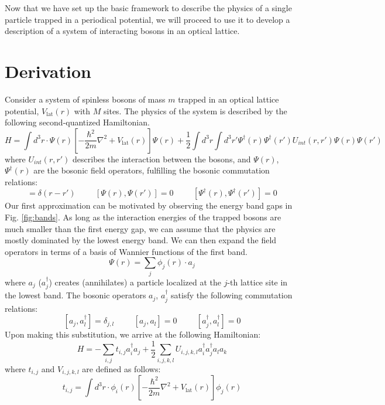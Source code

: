 Now that we have set up the basic framework to describe the physics of a single particle trapped in a periodical potential, we will proceed to use it to develop a description of a system of interacting bosons in an optical lattice.

\section{Derivation}\label{sec:bhmderiv}
Consider a system of spinless bosons of mass $m$ trapped in an optical lattice potential, $V_{\text{lat}}(r)$ with $M$ sites. The physics of the system is described by the following second-quantized Hamiltonian\cite{Fetter}.
\begin{equation}\label{eq:tise_second}
    H = \int d^3r \cdot \Psi(r) \left [ -\frac{\hbar^2}{2m}\nabla^2 + V_{\text{lat}}(r) \right ] \Psi(r) + \frac{1}{2}\int d^3r \int d^3r' \Psi^{\dagger}(r)\Psi^{\dagger}(r')U_{int}(r, r')\Psi(r)\Psi(r')
\end{equation}
where $U_{int}(r,r')$ describes the interaction between the bosons, and $\Psi(r)$, $\Psi^{\dagger}(r)$ are the bosonic field operators, fulfilling the bosonic commutation relations:
\begin{equation}
    [\Psi(r), \Psi^{\dagger}(r')] = \delta(r -r') \hspace{1cm} [\Psi(r), \Psi(r')] = 0 \hspace{1cm} [\Psi^{\dagger}(r), \Psi^{\dagger}(r')] = 0
\end{equation}
Our first approximation can be motivated by observing the energy band gaps in Fig. \ref{fig:bands}. As long as the interaction energies of the trapped bosons are much smaller than the first energy gap, we can assume that the physics are mostly dominated by the lowest energy band. We can then expand the field operators in terms of a basis of Wannier functions of the first band.
\begin{equation}
    \Psi(r) = \sum_j \phi_j(r) \cdot a_j    
\end{equation}
where $a_j$ ($a_j^{\dagger}$) creates (annihilates) a particle localized at the $j$-th lattice site in the lowest band. The bosonic operators $a_j$, $a_j^{\dagger}$ satisfy the following commutation relations:
\begin{equation}\label{eq:ccr}
    [a_j, a_l^{\dagger}] = \delta_{j, l} \hspace{1cm} [a_j, a_l] = 0 \hspace{1cm} [a_j^{\dagger}, a_l^{\dagger}] = 0
\end{equation}
Upon making this substitution, we arrive at the following Hamiltonian:
\begin{equation}
    H = -\sum_{i, j} t_{i, j} a_i^{\dagger}a_j + \frac{1}{2}\sum_{i, j, k, l} U_{i, j, k, l} a_i^{\dagger} a_j^{\dagger}a_l a_k
\end{equation}
where $t_{i, j}$ and $V_{i, j, k, l}$ are defined as follows:
\begin{equation}\label{eq:hopping_param}
    t_{i, j} = \int d^3r \cdot \phi_i(r) \left [ -\frac{\hbar^2}{2m}\nabla^2 + V_{\text{lat}}(r)\right ] \phi_j(r)
\end{equation}

